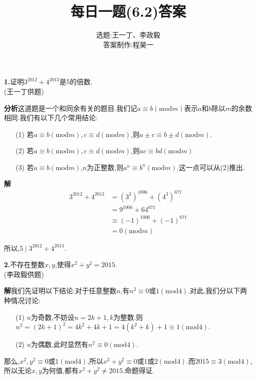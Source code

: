 \documentclass[UTF8]{ctexart}
\title{每日一题(6.2)答案}
\author{选题:王一丁、李政毅\\答案制作:程昊一}
\begin{document}
\maketitle
\textbf{1.}{证明$ 3^{2012}+4^{2013} $是5的倍数.\\
(王一丁供题)}
\par \textbf{分析}\quad 这道题是一个和同余有关的题目.我们记$ a\equiv b(\mathrm{mod}m) $表示$ a\text{和}b $除以$ m $的余数相同.我们有以下几个常用结论:
\begin{itemize}
	\item[(1)] 若$ a\equiv b( \mathrm{mod}{m}),c\equiv d( \mathrm{mod}{m}) $,则$ a\pm c\equiv b\pm d( \mathrm{mod}{m}) $.
	\item[(2)] 若$ a\equiv b( \mathrm{mod}{m}),c\equiv d( \mathrm{mod}{m}) $,则$ ac\equiv bd( \mathrm{mod}{m}) $
	\item[(3)] 若$ a\equiv b( \mathrm{mod}{m}) $,$ n $为正整数,则$ a^n\equiv b^n( \mathrm{mod}{m}) $.这一点可以从(2)推出.
\end{itemize}
\par\textbf{解}
\begin{align*}
3^{2012}+4^{2013}&=\left(3^2\right)^{1006}+\left(4^3\right)^{671}\\
&=9^{1006}+{64}^{671}\\
&\equiv (-1)^{1006}+(-1)^{671}\\
&=0(\mathrm{mod}m)
\end{align*}
\par 所以,$ 5\mid 3^{2012}+4^{2013} $.\\
\par\textbf{2.}{不存在整数$ x,y $,使得$ x^2+y^2=2015 $.\\
(李政毅供题)}
\par \textbf{解}\quad 我们先证明以下结论:对于任意整数$n$,有$ n^2\equiv 0\text{或}1(\mathrm{mod}4) $.对此,我们分以下两种情况讨论:
\begin{itemize}
\item[(1)] $ n $为奇数,不妨设$ n=2k+1,k $为整数.则
$ n^2=(2k+1)^2=4k^2+4k+1=4(k^2+k)+1\equiv 1(\mathrm{mod}4) $.
\item[(2)] $ n $为偶数,此时显然有$ n^2\equiv 0(\mathrm{mod}4) $.
\end{itemize}
\par 那么,$x^2,y^2\equiv0\text{或}1(\mathrm{mod}4)$,所以$x^2+y^2\equiv0\text{或}1\text{或}2(\mathrm{mod}4)$.而$2015\equiv3(\mathrm{mod}4)$,所以无论$x,y$为何值,都有$x^2+y^2\neq2015$.命题得证.
\end{document}
